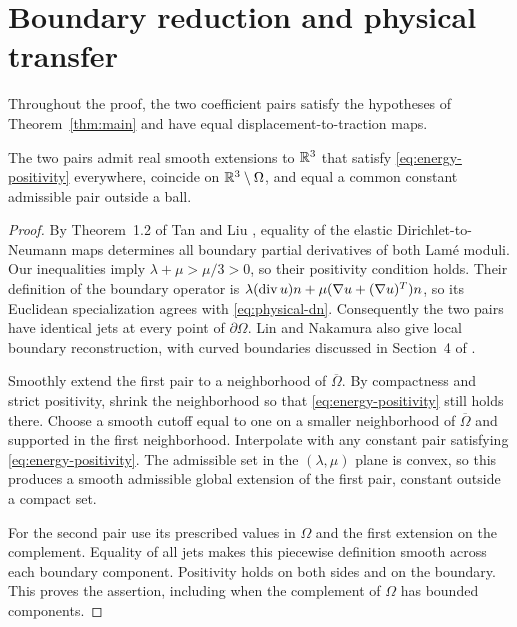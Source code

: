 \section{Boundary reduction and physical transfer}\label{sec:boundary-reduction}

Throughout the proof, the two coefficient pairs satisfy the hypotheses
of Theorem~\ref{thm:main} and have equal displacement-to-traction maps.

\begin{lemma}\label{lem:common-extension}
The two pairs admit real smooth extensions to $\mathbb R^3$ that satisfy
\eqref{eq:energy-positivity} everywhere, coincide on
$\mathbb R^3\setminus\Omega$, and equal a common constant admissible pair
outside a ball.
\end{lemma}

\begin{proof}
By Theorem~1.2 of Tan and Liu \cite{TanLiu2023}, equality of the elastic
Dirichlet-to-Neumann maps determines all boundary partial derivatives
of both Lam\'e moduli. Our inequalities imply
$\lambda+\mu>\mu/3>0$, so their positivity condition holds.
Their definition of the boundary operator is
$\lambda(\operatorname{div} u)n+\mu(\nabla u+(\nabla u)^T)n$, so its Euclidean
specialization agrees with \eqref{eq:physical-dn}.
Consequently the two pairs have identical jets at every point of
$\partial\Omega$. Lin and Nakamura also give local boundary
reconstruction, with curved boundaries discussed in Section~4 of
\cite{LinNakamura2017}.

Smoothly extend the first pair to a neighborhood of
$\overline\Omega$. By compactness and strict positivity, shrink the
neighborhood so that \eqref{eq:energy-positivity} still holds there.
Choose a smooth cutoff equal to one on a smaller neighborhood of
$\overline\Omega$ and supported in the first neighborhood. Interpolate
with any constant pair satisfying \eqref{eq:energy-positivity}.
The admissible set in the $(\lambda,\mu)$ plane is convex, so this
produces a smooth admissible global extension of the first pair, constant
outside a compact set.

For the second pair use its prescribed values in $\Omega$ and the first
extension on the complement. Equality of all jets makes this piecewise
definition smooth across each boundary component. Positivity holds on
both sides and on the boundary. This proves the assertion, including
when the complement of $\Omega$ has bounded components.
\end{proof}

